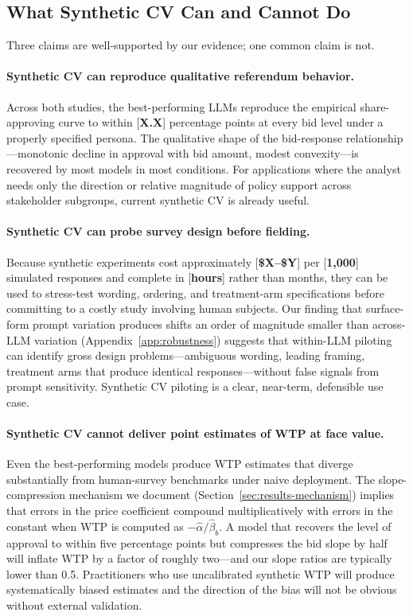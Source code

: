 \documentclass[12pt]{article}
\begin{document}
\subsection{What Synthetic CV Can and Cannot Do}\label{sec:disc-can-cant}

Three claims are well-supported by our evidence; one common claim is not.

\paragraph{Synthetic CV can reproduce qualitative referendum behavior.} Across both studies, the best-performing LLMs reproduce the empirical share-approving curve to within [\textbf{X.X}] percentage points at every bid level under a properly specified persona. The qualitative shape of the bid-response relationship---monotonic decline in approval with bid amount, modest convexity---is recovered by most models in most conditions. For applications where the analyst needs only the direction or relative magnitude of policy support across stakeholder subgroups, current synthetic CV is already useful.

\paragraph{Synthetic CV can probe survey design before fielding.} Because synthetic experiments cost approximately [\textbf{\$X--\$Y}] per [\textbf{1{,}000}] simulated responses and complete in [\textbf{hours}] rather than months, they can be used to stress-test wording, ordering, and treatment-arm specifications before committing to a costly study involving human subjects. Our finding that surface-form prompt variation produces shifts an order of magnitude smaller than across-LLM variation (Appendix~\ref{app:robustness}) suggests that within-LLM piloting can identify gross design problems---ambiguous wording, leading framing, treatment arms that produce identical responses---without false signals from prompt sensitivity. Synthetic CV piloting is a clear, near-term, defensible use case.

\paragraph{Synthetic CV cannot deliver point estimates of WTP at face value.} Even the best-performing models produce WTP estimates that diverge substantially from human-survey benchmarks under naive deployment. The slope-compression mechanism we document (Section~\ref{sec:results-mechanism}) implies that errors in the price coefficient compound multiplicatively with errors in the constant when WTP is computed as $-\hat{\alpha}/\hat{\beta}_b$. A model that recovers the level of approval to within five percentage points but compresses the bid slope by half will inflate WTP by a factor of roughly two---and our slope ratios are typically lower than 0.5. Practitioners who use uncalibrated synthetic WTP will produce systematically biased estimates and the direction of the bias will not be obvious without external validation.
\end{document}
